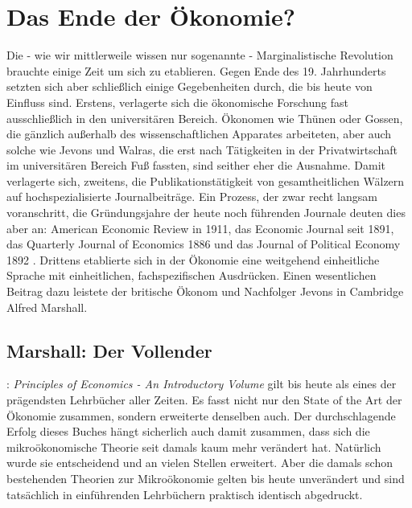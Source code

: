 %
%
%

\chapter{Das Ende der Ökonomie?}
\label{Neoklassik}

Die - wie wir mittlerweile wissen nur sogenannte - Marginalistische Revolution brauchte einige Zeit um sich zu etablieren. Gegen Ende des 19. Jahrhunderts setzten sich aber schließlich einige Gegebenheiten durch, die bis heute von Einfluss sind. Erstens, verlagerte sich die ökonomische Forschung fast ausschließlich in den universitären Bereich. Ökonomen wie Thünen oder Gossen, die gänzlich außerhalb des wissenschaftlichen Apparates arbeiteten, aber auch solche wie Jevons und Walras, die erst nach Tätigkeiten in der Privatwirtschaft im universitären Bereich Fuß fassten, sind seither eher die Ausnahme. Damit verlagerte sich, zweitens, die Publikationstätigkeit von gesamtheitlichen Wälzern auf hochspezialisierte Journalbeiträge. Ein Prozess, der zwar recht langsam voranschritt, die Gründungsjahre der heute noch führenden Journale deuten dies aber an: American Economic Review in 1911, das Economic Journal seit 1891, das Quarterly Journal of Economics 1886 und das Journal of Political Economy 1892 \parencite[S. 340]{Rosner2012}.
Drittens etablierte sich in der Ökonomie eine weitgehend einheitliche Sprache mit einheitlichen, fachspezifischen Ausdrücken. Einen wesentlichen Beitrag dazu leistete der britische Ökonom und Nachfolger Jevons in Cambridge Alfred Marshall.

\section{Marshall: Der Vollender}

\textcite{Marshall1890}: \textit{Principles of Economics - An Introductory Volume} gilt bis heute als eines der prägendsten Lehrbücher aller Zeiten. Es fasst nicht nur den State of the Art der Ökonomie zusammen, sondern erweiterte denselben auch. Der durchschlagende Erfolg dieses Buches hängt sicherlich auch damit zusammen, dass sich die mikroökonomische Theorie seit damals kaum mehr verändert hat. Natürlich wurde sie entscheidend und an vielen Stellen erweitert. Aber die damals schon bestehenden Theorien zur Mikroökonomie gelten bis heute unverändert und sind tatsächlich in einführenden Lehrbüchern praktisch identisch abgedruckt.

